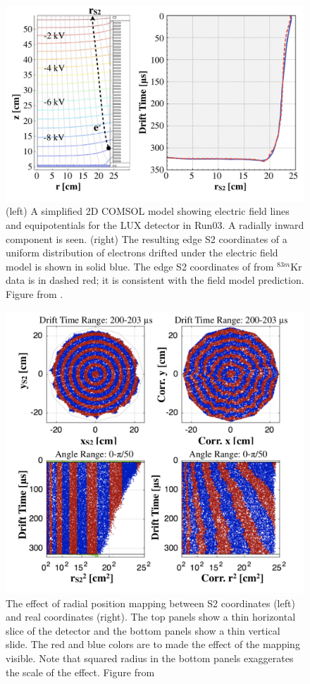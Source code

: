 \begin{figure}[htbp]
\begin{center}
\includegraphics[width=.8\textwidth]{figures/lux/kr_pos1.png}
\caption{ (left) A simplified 2D COMSOL model showing electric field lines and equipotentials for the \acs{LUX} detector in Run03. A radially inward component is seen. (right) The resulting edge S2 coordinates of a uniform distribution of electrons drifted under the electric field model is shown in solid blue. The edge S2 coordinates of from $^{83m}$Kr data is in dashed red; it is consistent with the field model prediction. Figure from \cite{LUXKr}.}
\label{fig:kr_pos1}
\end{center}
\end{figure}

\begin{figure}[htbp]
\begin{center}
\includegraphics[width=.8\textwidth]{figures/lux/kr_pos2.png}
\caption{ The effect of radial position mapping between S2 coordinates (left) and real coordinates (right). The top panels show a thin horizontal slice of the detector and the bottom panels show a thin vertical slide. The red and blue colors are to made the effect of the mapping visible. Note that squared radius in the bottom panels exaggerates the scale of the effect. Figure from \cite{LUXKr} }
\label{fig:kr_pos2}
\end{center}
\end{figure}

